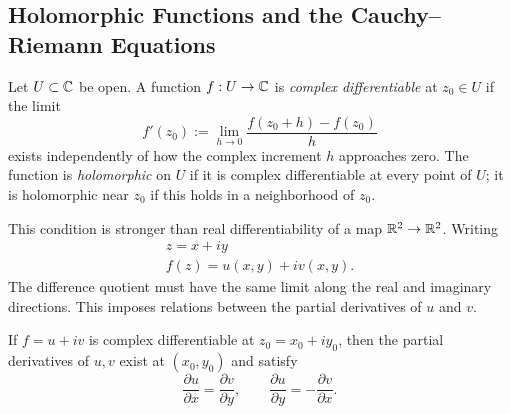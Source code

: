 \subsection{Holomorphic Functions and the Cauchy--Riemann Equations}

\begin{definition}
Let $U\subset\mathbb{C}$ be open. A function $f:U\to\mathbb{C}$ is \emph{complex differentiable} at $z_0\in U$ if the limit \[
f'(z_0):=\lim_{h\to0}\frac{f(z_0+h)-f(z_0)}{h}
\] exists independently of how the complex increment $h$ approaches zero. The function is \emph{holomorphic} on $U$ if it is complex differentiable at every point of $U$; it is holomorphic near $z_0$ if this holds in a neighborhood of $z_0$.
\end{definition}

This condition is stronger than real differentiability of a map $\mathbb{R}^2\to\mathbb{R}^2$. Writing
\[
\begin{gathered}
z=x+iy \\
f(z)=u(x,y)+iv(x,y).
\end{gathered}
\]
The difference quotient must have the same limit along the real and imaginary directions. This imposes relations between the partial derivatives of $u$ and $v$.

\begin{theorem}
If $f=u+iv$ is complex differentiable at $z_0=x_0+iy_0$, then the partial derivatives of $u,v$ exist at $(x_0,y_0)$ and satisfy
\begin{equation}
\frac{\partial u}{\partial x}=\frac{\partial v}{\partial y},
\qquad
\frac{\partial u}{\partial y}=-\frac{\partial v}{\partial x}.
\end{equation}

\end{theorem}

